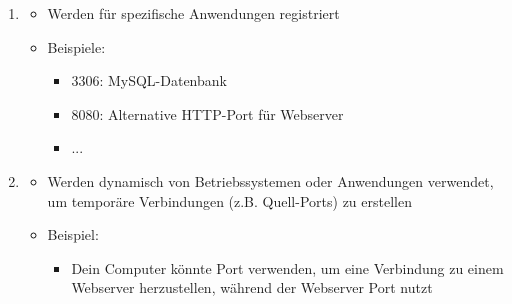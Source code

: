 \begin{itemize}
\begin{infoBox}[title=Portnummern: Kategorien]
\begin{enumerate}
\begin{itemize}
                \item Beispiele:
                \begin{itemize}
                    \item 20, 21: FTP (File Transfer Protocol)
                    \item 22: SSH (Secure Shell, Ferzugriff)
                    \item 25: SMTP (E-Mail-Versand)
                    \item 53: DNS (Namensauflösung)
                    \item 80: HTTP (Unverschlüsseltes Web)
                    \item 443: HTTPS (Verschlüsseltes Web)
                    \item ...
                \end{itemize}
            \end{itemize}
            \item {}
            \begin{itemize}
                \item Werden für spezifische Anwendungen registriert
                \item Beispiele:
                \begin{itemize}
                    \item 3306: MySQL-Datenbank
                    \item 8080: Alternative HTTP-Port für Webserver
                    \item ...
                \end{itemize}
            \end{itemize}
            \item {}
            \begin{itemize}
                \item Werden dynamisch von Betriebssystemen oder Anwendungen verwendet, um temporäre Verbindungen (z.B. Quell-Ports) zu erstellen
                \item Beispiel:
                \begin{itemize}
                    \item Dein Computer könnte Port  verwenden, um eine Verbindung zu einem Webserver herzustellen, während der Webserver Port  nutzt
                \end{itemize}
            \end{itemize}

\end{enumerate}
\end{infoBox}
\end{itemize}
